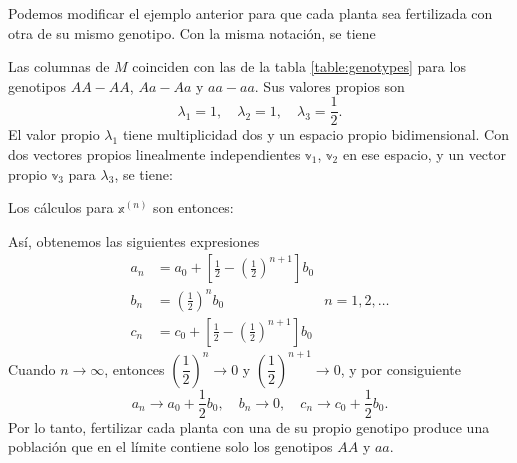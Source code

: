 \newpage

\begin{examplebox}{}{}
    Podemos modificar el ejemplo anterior para que cada planta sea fertilizada con otra de su mismo genotipo. Con la misma notación, se tiene
    \begin{matrizn}
    \end{matrizn}
    Las columnas de $M$ coinciden con las de la tabla \ref{table:genotypes} para los genotipos $AA - AA$, $Aa - Aa$ y $aa - aa$. Sus valores propios son
    $$\lambda_1 = 1, \quad \lambda_2 = 1, \quad \lambda_3 = \frac{1}{2}.$$
    El valor propio $\lambda_1$ tiene multiplicidad dos y un espacio propio bidimensional. Con dos vectores propios linealmente independientes $\mathbb{v}_1$, $\mathbb{v}_2$ en ese espacio, y un vector propio $\mathbb{v}_3$ para $\lambda_3$, se tiene:
    \begin{matrizn}
    \end{matrizn}
    Los cálculos para $\mathbb{x}^{(n)}$ son entonces:
    \begin{matrizn}
    \end{matrizn}
    Así, obtenemos las siguientes expresiones
    \begin{equation}
        \begin{aligned}
            a_n & = a_0 + \left[\frac{1}{2} - \left(\frac{1}{2}\right)^{n+1}\right] b_0 \\
            b_n & = \left(\frac{1}{2}\right)^n b_0 \hspace{3cm} n = 1, 2, \dots\\
            c_n & = c_0 + \left[\frac{1}{2} - \left(\frac{1}{2}\right)^{n+1}\right] b_0
        \end{aligned} \label{genetica6}
    \end{equation}
    Cuando $n \to \infty$, entonces $\left( \dfrac{1}{2} \right)^n \to 0$ y $\left( \dfrac{1}{2} \right)^{n+1} \to 0$, y por consiguiente
    $$a_n \to a_0 + \frac{1}{2} b_0, \quad b_n \to 0, \quad c_n \to c_0 + \frac{1}{2} b_0.$$
    Por lo tanto, fertilizar cada planta con una de su propio genotipo produce una población que en el límite contiene solo los genotipos $AA$ y $aa$.
\end{examplebox}
